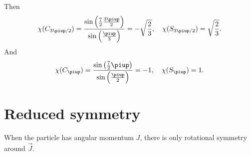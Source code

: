 \documentclass[11pt, english, fleqn, DIV=15, headinclude, BCOR=1cm]{scrartcl}
\begin{document}
Then
\[
    \chi(C_{3\piup/2})
    = \frac{\sin\del{\frac72 \frac{3\piup}2}}{\sin\del{\frac\piup3}}
    = - \sqrt{\frac23}
    \eqnsep
    \chi(S_{3\piup/2}) = \sqrt{\frac23}.
\]
And
\[
    \chi(C_{\piup})
    = \frac{\sin\del{\frac72 \piup}}{\sin\del{\frac\piup2}}
    = - 1
    \eqnsep
    \chi(S_{\piup}) = 1.
\]


\section{Reduced symmetry}

When the particle has angular momentum $J$, there is only rotational symmetry
around $\vec J$.
\end{document}
